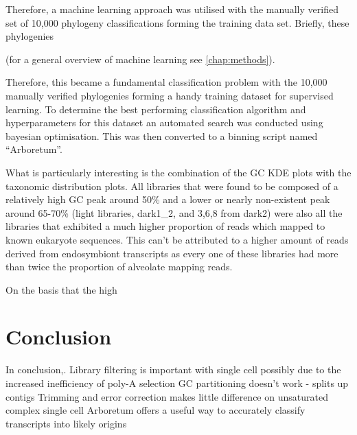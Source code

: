Therefore, a machine learning approach was utilised with the manually verified set of 10,000 phylogeny
classifications forming the training data set. Briefly, these phylogenies 



(for a general overview of machine learning see
\ref{chap:methods}).



Therefore, this became a fundamental classification problem with the 10,000 manually verified phylogenies
forming a handy training dataset for supervised learning.   To determine the best performing
classification algorithm and hyperparameters for this dataset an automated search was conducted 
using bayesian optimisation.  This was then converted to a binning script named ``Arboretum''.



%
%



What is particularly interesting is the combination of the GC KDE plots 
with the taxonomic distribution plots.
All libraries that were found to be composed of a relatively high GC peak around 50\% 
and a lower or nearly non-existent peak around 65-70\% (light libraries, dark1\_2,
and 3,6,8 from dark2) were also all the libraries that exhibited a much higher
proportion of reads which mapped to known eukaryote sequences.
This can't be attributed to a higher amount of reads derived from endosymbiont
transcripts as every one of these libraries had more than twice the proportion of
alveolate mapping reads.



On the basis that the high 



\section{Conclusion}

In conclusion,.
Library filtering is important with single cell possibly due to the increased inefficiency of poly-A selection
GC partitioning doesn't work - splits up contigs
Trimming and error correction makes little difference on unsaturated complex single cell 
Arboretum offers a useful way to accurately classify transcripts into likely origins 






